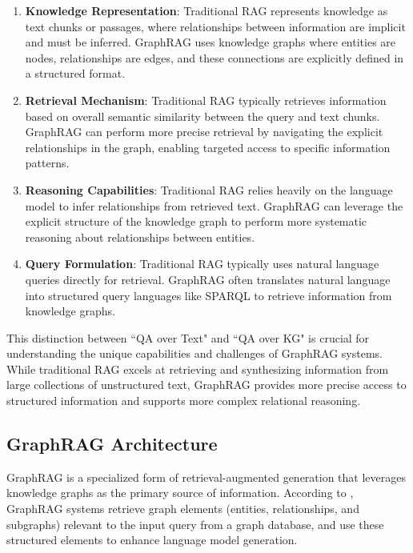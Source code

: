\begin{enumerate}
    \item \textbf{Knowledge Representation}: Traditional RAG represents knowledge as text chunks or passages, where relationships between information are implicit and must be inferred. GraphRAG uses knowledge graphs where entities are nodes, relationships are edges, and these connections are explicitly defined in a structured format.
    
    \item \textbf{Retrieval Mechanism}: Traditional RAG typically retrieves information based on overall semantic similarity between the query and text chunks. GraphRAG can perform more precise retrieval by navigating the explicit relationships in the graph, enabling targeted access to specific information patterns.
    
    \item \textbf{Reasoning Capabilities}: Traditional RAG relies heavily on the language model to infer relationships from retrieved text. GraphRAG can leverage the explicit structure of the knowledge graph to perform more systematic reasoning about relationships between entities.
    
    \item \textbf{Query Formulation}: Traditional RAG typically uses natural language queries directly for retrieval. GraphRAG often translates natural language into structured query languages like SPARQL to retrieve information from knowledge graphs.
\end{enumerate}

This distinction between ``QA over Text" and ``QA over KG" is crucial for understanding the unique capabilities and challenges of GraphRAG systems. While traditional RAG excels at retrieving and synthesizing information from large collections of unstructured text, GraphRAG provides more precise access to structured information and supports more complex relational reasoning.

\subsection{GraphRAG Architecture}
GraphRAG is a specialized form of retrieval-augmented generation that leverages knowledge graphs as the primary source of information. According to \cite{peng2024graphretrievalaugmentedgenerationsurvey}, GraphRAG systems retrieve graph elements (entities, relationships, and subgraphs) relevant to the input query from a graph database, and use these structured elements to enhance language model generation.

